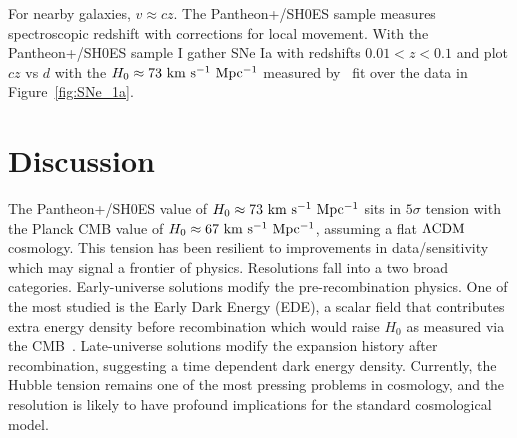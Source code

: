 \documentclass[11pt,twocolumn]{article}
\begin{document}
For nearby galaxies, $v\approx cz$. The Pantheon+/SH0ES sample measures spectroscopic redshift with corrections for local movement. With the Pantheon+/SH0ES sample I gather SNe Ia with redshifts $0.01<z<0.1$ and plot $cz$ vs $d$ with the $H_0 \approx 73 \rm \ km \ s^{-1}\ Mpc^{-1}$ measured by~\cite{Pantheon2022_parameters} fit over the data in Figure~\ref{fig:SNe_1a}.

\section{Discussion}

The Pantheon+/SH0ES value of $H_0 \approx 73 \rm \ km \ s^{-1}\ Mpc^{-1}$ sits in $5\sigma$ tension with the Planck CMB value of $H_0 \approx 67 \rm \ km \ s^{-1}\ Mpc^{-1}$, assuming a flat $\rm \Lambda CDM$ cosmology. This tension has been resilient to improvements in data/sensitivity which may signal a frontier of physics. Resolutions fall into a two broad categories. Early-universe solutions modify the pre-recombination physics. One of the most studied is the Early Dark Energy (EDE), a scalar field that contributes extra energy density before recombination which would raise $H_0$ as measured via the CMB~\cite{Doran2006}. Late-universe solutions modify the expansion history after recombination, suggesting a time dependent dark energy density. Currently, the Hubble tension remains one of the most pressing problems in cosmology, and the resolution is likely to have profound implications for the standard cosmological model.



\end{document}
